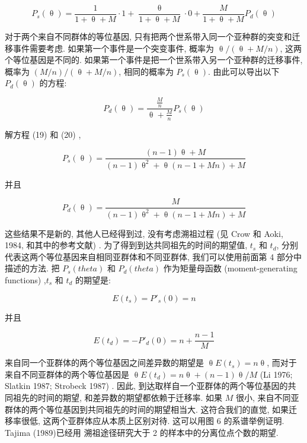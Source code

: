 \documentclass[
    12pt,%
    ]{article}
\begin{document}
\begin{equation} \label{eq:19}
    P_{s}(\uptheta)=\frac{1}{1+\uptheta +M}\cdot 1+\frac{\uptheta}{1+\uptheta +M}\cdot 0+\frac{M}{1+\uptheta +M}P_{d}(\uptheta)
\end{equation}

对于两个来自不同群体的等位基因, 只有把两个世系带入同一个亚种群的突变和迁移事件需要考虑. 如果第一个事件是一个突变事件,
概率为 $\uptheta /(\uptheta +M/n)$, 这两个等位基因是不同的. 如果第一个事件是把一个世系带入另一个亚种群的迁移事件, 概率为
$(M/n)/(\uptheta +M/n)$, 相同的概率为 $P_{s}(\uptheta)$. 由此可以导出以下 $P_{d}(\uptheta)$ 的方程:

\begin{equation} \label{eq:20}
    P_{d}(\uptheta)=\frac{\frac{M}{n}}{\uptheta +\frac{M}{n}}P_{s}(\uptheta)
\end{equation}

解方程 (19) 和 (20) ,

\begin{equation} \label{eq:21}
    P_{s}(\uptheta)=\frac{(n-1)\uptheta +M}{(n-1)\uptheta ^{2}+\uptheta (n-1+Mn)+M}
\end{equation}

并且

\begin{equation} \label{eq:22}
    P_{d}(\uptheta)=\frac{M}{(n-1)\uptheta ^{2}+\uptheta (n-1+Mn)+M}
\end{equation}

这些结果不是新的, 其他人已经得到过, 没有考虑溯祖过程 (见 Crow 和 Aoki, 1984, 和其中的参考文献) .
为了得到到达共同祖先的时间的期望值, $t_{s}$ 和 $t_{d}$, 分别代表这两个等位基因来自相同亚群体和不同亚群体,
我们可以使用前面第 4 部分中描述的方法. 把 $P_{s}(theta )$ 和 $P_{d}(theta )$ 作为矩量母函数 (moment-generating
functions) ,$t_{s}$ 和 $t_{d}$ 的期望是:

\begin{equation} \label{eq:23}
    E(t_{s}) = P'_{s}(0) = n
\end{equation}

并且

\begin{equation} \label{eq:24}
    E(t_{d}) = -P'_{d}(0) = n + \frac{n-1}{M}
\end{equation}

来自同一个亚群体的两个等位基因之间差异数的期望是 $\uptheta E(t_{s}) = n \uptheta$, 而对于来自不同亚群体的两个等位基因是
$\uptheta E(t_{d}) = n \uptheta +(n-1)\uptheta /M$ (Li 1976; Slatkin 1987; Strobeck 1987) . 因此,
到达取样自一个亚群体的两个等位基因的共同祖先的时间的期望, 和差异数的期望都依赖于迁移率. 如果 $M$ 很小,
来自不同亚群体的两个等位基因到共同祖先的时间的期望相当大. 这符合我们的直觉, 如果迁移率很低, 这两个亚群体应从本质上区别对待.
这可以用图 6 的系谱举例证明. Tajima (1989)已经用 溯祖途径研究大于 2 的样本中的分离位点个数的期望.
\end{document}
